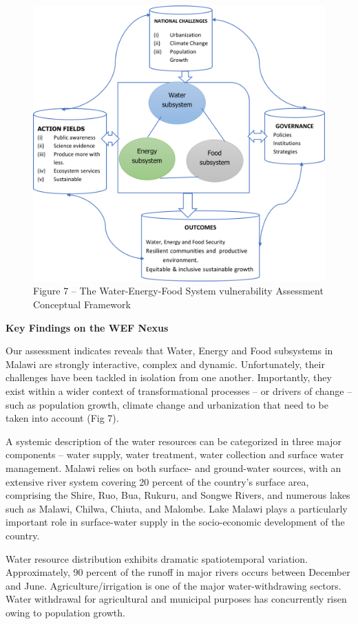 \documentclass[
]{book}
\begin{document}
\begin{figure}
\centering
\includegraphics{images/wef_nexus.png}
\caption{Figure 7 -- The Water-Energy-Food System vulnerability Assessment Conceptual Framework}
\end{figure}

\textbf{Key Findings on the WEF Nexus}

Our assessment indicates reveals that Water, Energy and Food subsystems in Malawi are strongly interactive, complex and dynamic. Unfortunately, their challenges have been tackled in isolation from one another. Importantly, they exist within a wider context of transformational processes -- or drivers of change -- such as population growth, climate change and urbanization that need to be taken into account (Fig 7).

A systemic description of the water resources can be categorized in three major components -- water supply, water treatment, water collection and surface water management. Malawi relies on both surface- and ground-water sources, with an extensive river system covering 20 percent of the country's surface area, comprising the Shire, Ruo, Bua, Rukuru, and Songwe Rivers, and numerous lakes such as Malawi, Chilwa, Chiuta, and Malombe. Lake Malawi plays a particularly important role in surface-water supply in the socio-economic development of the country.

Water resource distribution exhibits dramatic spatiotemporal variation. Approximately, 90 percent of the runoff in major rivers occurs between December and June. Agriculture/irrigation is one of the major water-withdrawing sectors. Water withdrawal for agricultural and municipal purposes has concurrently risen owing to population growth.
\end{document}
